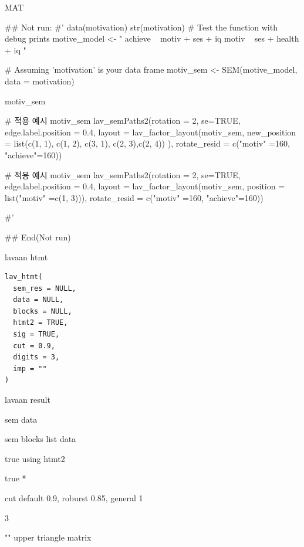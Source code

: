 \documentclass[a4paper]{book}
\begin{document}
%
\begin{Value}
MAT
\end{Value}
%
\begin{Examples}
\begin{ExampleCode}

## Not run: 
#'
data(motivation)
str(motivation)
# Test the function with debug prints
motive_model <- "
achieve ~ motiv + ses + iq
motiv ~ ses + health + iq
"

# Assuming 'motivation' is your data frame
motiv_sem <- SEM(motive_model, data = motivation)

motiv_sem%

# 적용 예시
motiv_sem %
  lav_semPaths2(rotation = 2, se=TRUE,
  edge.label.position = 0.4,
                layout =
                lav_factor_layout(motiv_sem,
       new_position = list(c(1, 1), c(1, 2),
       c(3, 1), c(2, 3),c(2, 4)) ),
            rotate_resid = c("motiv" =160, "achieve"=160))


# 적용 예시
motiv_sem %
  lav_semPaths2(rotation = 2, se=TRUE,
  edge.label.position = 0.4,
                layout = lav_factor_layout(motiv_sem,
                                           position = list("motiv" =c(1, 3))),
                rotate_resid = c("motiv" =160, "achieve"=160))

#'

## End(Not run)

\end{ExampleCode}
\end{Examples}
%
\begin{Description}
lavaan htmt
\end{Description}
%
\begin{Usage}
\begin{verbatim}
lav_htmt(
  sem_res = NULL,
  data = NULL,
  blocks = NULL,
  htmt2 = TRUE,
  sig = TRUE,
  cut = 0.9,
  digits = 3,
  imp = ""
)
\end{verbatim}
\end{Usage}
%
\begin{Arguments}
\begin{ldescription}
\item[\code{sem\_res}] lavaan result

\item[\code{data}] sem data

\item[\code{blocks}] sem blocks list data

\item[\code{htmt2}] true using htmt2

\item[\code{sig}] true *

\item[\code{cut}] cut default 0.9, roburst 0.85, general 1

\item[\code{digits}] 3

\item[\code{imp}] "" upper triangle matrix
\end{ldescription}
\end{Arguments}
\end{document}
